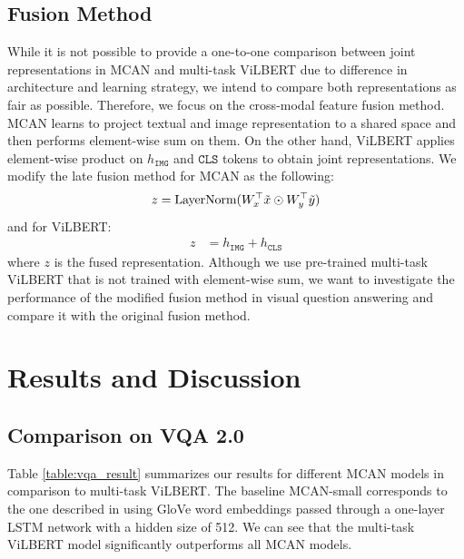\documentclass{article}
\begin{document}


\subsection{Fusion Method}
While it is not possible to provide a one-to-one comparison between joint representations in MCAN and multi-task ViLBERT due to difference in architecture and learning strategy, we intend to compare both representations as fair as possible. Therefore, we focus on the cross-modal feature fusion method. MCAN learns to project textual and image representation to a shared space and then performs element-wise sum on them. On the other hand, ViLBERT applies element-wise product on $h_{\mathtt{IMG}}$ and $\mathtt{CLS}$ tokens to obtain joint representations. We modify the late fusion method for MCAN as the following:
\begin{align}
    z &= \text{LayerNorm}(W^{\top}_{x}\Tilde{x} \odot W^{\top}_{y}\Tilde{y}) \\
\end{align}
and for ViLBERT:
\begin{align}
    z &= h_{\mathtt{IMG}} + h_{\mathtt{CLS}}
\end{align}
where $z$ is the fused representation. Although we use pre-trained multi-task ViLBERT that is not trained with element-wise sum, we want to investigate the performance of the modified fusion method in visual question answering and compare it with the original fusion method. 

\section{Results and Discussion}

\subsection{Comparison on VQA 2.0} \label{comp_vqa}

Table \ref{table:vqa_result} summarizes our results for different MCAN models in comparison to multi-task ViLBERT. The baseline MCAN-small corresponds to the one described in \cite{yu2019mcan} using GloVe word embeddings passed through a one-layer LSTM network with a hidden size of 512. We can see that the multi-task ViLBERT model significantly outperforms all MCAN models.
\end{document}
